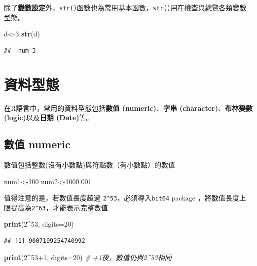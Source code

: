 \documentclass[]{book}
\newenvironment{Shaded}{\begin{snugshade}}{\end{snugshade}}
\newcommand{\KeywordTok}[1]{\textcolor[rgb]{0.13,0.29,0.53}{\textbf{{#1}}}}
\newcommand{\DataTypeTok}[1]{\textcolor[rgb]{0.13,0.29,0.53}{{#1}}}
\newcommand{\DecValTok}[1]{\textcolor[rgb]{0.00,0.00,0.81}{{#1}}}
\newcommand{\FloatTok}[1]{\textcolor[rgb]{0.00,0.00,0.81}{{#1}}}
\newcommand{\CommentTok}[1]{\textcolor[rgb]{0.56,0.35,0.01}{\textit{{#1}}}}
\newcommand{\NormalTok}[1]{{#1}}
\theoremstyle{definition}
\theoremstyle{definition}
\theoremstyle{remark}
\begin{document}
除了\textbf{變數設定}外，\texttt{str()}函數也為常用基本函數，\texttt{str()}用在檢查與總覽各類變數型態。

\begin{Shaded}
\begin{Highlighting}[]
\NormalTok{d<-}\DecValTok{3}
\KeywordTok{str}\NormalTok{(d)}
\end{Highlighting}
\end{Shaded}

\begin{verbatim}
##  num 3
\end{verbatim}

\section{資料型態}

在R語言中，常用的資料型態包括\textbf{數值 (numeric)}、\textbf{字串
(character)}、\textbf{布林變數 (logic)}以及\textbf{日期 (Date)}等。

\subsection{數值 numeric}\label{-numeric}

數值包括整數(沒有小數點)與符點數（有小數點）的數值

\begin{Shaded}
\begin{Highlighting}[]
\NormalTok{num1<-}\DecValTok{100} 
\NormalTok{num2<-}\FloatTok{1000.001}
\end{Highlighting}
\end{Shaded}

值得注意的是，若數值長度超過 \texttt{2\^{}53}，必須導入\texttt{bit64}
package
\citep{R-bit64}，將數值長度上限提高為\texttt{2\^{}63}，才能表示完整數值

\begin{Shaded}
\begin{Highlighting}[]
\KeywordTok{print}\NormalTok{(}\DecValTok{2}\NormalTok{^}\DecValTok{53}\NormalTok{, }\DataTypeTok{digits=}\DecValTok{20}\NormalTok{) }
\end{Highlighting}
\end{Shaded}

\begin{verbatim}
## [1] 9007199254740992
\end{verbatim}

\begin{Shaded}
\begin{Highlighting}[]
\KeywordTok{print}\NormalTok{(}\DecValTok{2}\NormalTok{^}\DecValTok{53+1}\NormalTok{, }\DataTypeTok{digits=}\DecValTok{20}\NormalTok{) }\CommentTok{# +1後，數值仍與2^53相同}
\end{Highlighting}
\end{Shaded}
\end{document}
